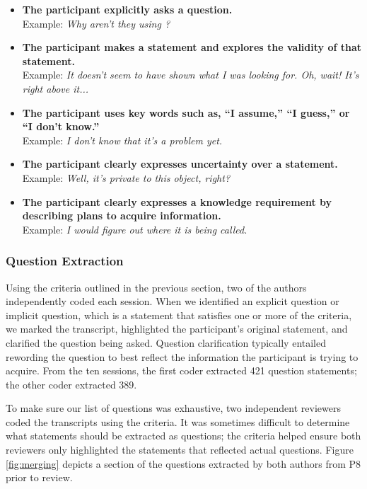 \documentclass[conference]{IEEEtran}
\begin{document}
\begin{itemize}
\item \textbf{The participant explicitly asks a question.}
\\ Example: \textit{Why aren't they using ?}
\item \textbf{The participant makes a statement and explores the validity of that statement.}
\\ Example: \textit{It doesn't seem to have shown what I was looking for. Oh, wait! It's right above it...}
\item \textbf{The participant uses key words such as, ``I assume,'' ``I guess,'' or ``I don't know.''}
\\ Example: \textit{I don't know that it's a problem yet.}
\item \textbf{The participant clearly expresses uncertainty over a statement.}
\\ Example: \textit{Well, it's private to this object, right?}
\item \textbf{The participant clearly expresses a knowledge requirement by describing plans to acquire information.}
\\ Example: \textit{I would figure out where it is being called.}

\end{itemize}

\subsubsection{Question Extraction}
Using the criteria outlined in the previous section, two of the authors independently coded each session. 
When we identified an explicit question or implicit question, which is a statement that satisfies one or more of the criteria, we marked the transcript, highlighted the participant's original statement, and clarified the question being asked.
Question clarification typically entailed rewording the question to best reflect the information the participant is trying to acquire.
From the ten sessions, the first coder extracted 421 question statements; the other coder extracted 389. 

To make sure our list of questions was exhaustive, two independent reviewers coded the transcripts using the criteria.
It was sometimes difficult to determine what statements should be extracted as questions; the criteria helped ensure both reviewers only highlighted the statements that reflected actual questions. 
Figure \ref{fig:merging} depicts a section of the questions extracted by both authors from P8 prior to review.
\end{document}
